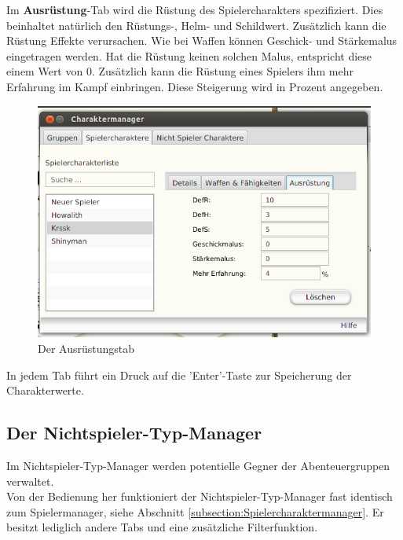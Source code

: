 \documentclass[11pt, a4paper, german]{article}
\begin{document}
Im \textbf{Ausrüstung}-Tab wird die Rüstung des Spielercharakters spezifiziert. Dies beinhaltet natürlich den Rüstungs-, Helm- und Schildwert. Zusätzlich kann die Rüstung Effekte verursachen. Wie bei Waffen können Geschick- und Stärkemalus eingetragen werden. Hat die Rüstung keinen solchen Malus, entspricht diese einem Wert von 0. Zusätzlich kann die Rüstung eines Spielers ihm mehr Erfahrung im Kampf einbringen. Diese Steigerung wird in Prozent angegeben.\\
\begin{figure}
\centering
\includegraphics[width=1\linewidth]{Bilder/Spielercharaktermanager3}
\caption{Der Ausrüstungstab}
\label{fig:Spielercharaktermanager3}
\end{figure}

In jedem Tab führt ein Druck auf die 'Enter'-Taste zur Speicherung der Charakterwerte.
\subsection{Der Nichtspieler-Typ-Manager}
Im Nichtspieler-Typ-Manager werden potentielle Gegner der Abenteuergruppen verwaltet. \\

Von der Bedienung her funktioniert der Nichtspieler-Typ-Manager fast identisch zum Spielermanager, siehe Abschnitt \ref{subsection:Spielercharaktermanager}. Er besitzt lediglich andere Tabs und eine zusätzliche Filterfunktion.\\
\end{document}

